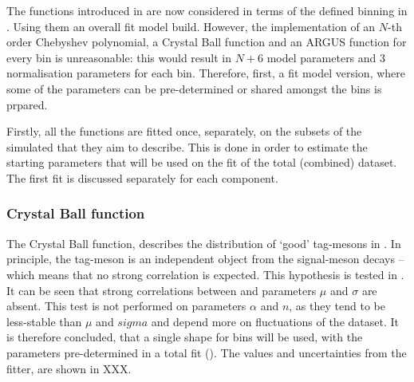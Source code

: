 The functions introduced in  are now considered in terms of the defined binning in .
Using them an overall fit model build.
However, the implementation of an $N$-th order Chebyshev polynomial, a Crystal Ball function and an ARGUS function for every \EB bin is unreasonable:
this would result in $N+6$ model parameters and 3 normalisation parameters for each bin.
Therefore, first, a fit model version, where some of the parameters can be pre-determined or shared amongst the bins is prpared.

Firstly, all the functions are fitted once, separately, on the subsets of the simulated that they aim to describe.
This is done in order to estimate the starting parameters that will be used on the fit of the total (combined) dataset.
The first fit is discussed separately for each component.


\subsubsection{Crystal Ball function}\label{sec:crystal_ball_prefit}

The Crystal Ball function, describes the distribution of `good' tag-\B mesons in \Mbc.
In principle, the tag-\B meson is an independent object from the signal-\B meson decays -- which means that no strong \EB correlation is expected.
This hypothesis is tested in .
It can be seen that strong correlations between \EB and parameters $\mu$ and $\sigma$ are absent.
This test is not performed on parameters $\alpha$ and $n$, as they tend to be less-stable than $\mu$ and $sigma$ and depend more on fluctuations of the dataset.
It is therefore concluded, that a single \Mbc shape for \EB bins will be used, with the parameters pre-determined in a total fit ().
The values and uncertainties from the fitter, are shown in XXX.


